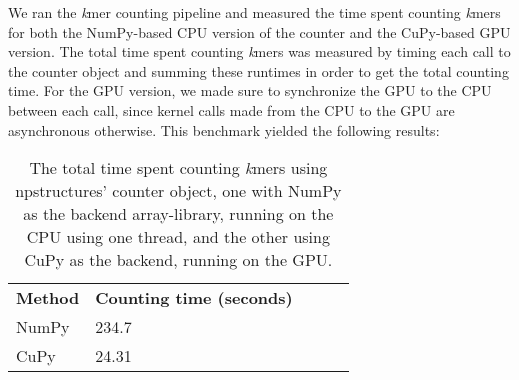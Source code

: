 We ran the \textit{k}mer counting pipeline and measured the time spent counting \textit{k}mers for both the NumPy-based CPU version of the counter and the CuPy-based GPU version.
The total time spent counting \textit{k}mers was measured by timing each call to the counter object and summing these runtimes in order to get the total counting time.
For the GPU version, we made sure to synchronize the GPU to the CPU between each call, since kernel calls made from the CPU to the GPU are asynchronous otherwise.
This benchmark yielded the following results: 

\begin{table}[H]
\begin{center}
\begin{tabular}{lllll}
\multicolumn{1}{l|}{\textbf{Method}} & \multicolumn{1}{l}{\textbf{Counting time (seconds)}} &  \\ \cline{1-2}
\multicolumn{1}{l|}{NumPy} & \multicolumn{1}{l}{234.7} &  \\
\multicolumn{1}{l|}{CuPy} & \multicolumn{1}{l}{24.31}
\end{tabular}
\end{center}
\caption{
  The total time spent counting \textit{k}mers using npstructures' counter object, one with NumPy as the backend array-library, running on the CPU using one thread, and the other using CuPy as the backend, running on the GPU.
}
\label{methods:initial_testing:tables:benchmark}
\end{table}

